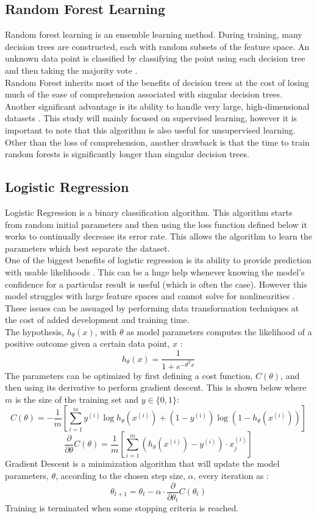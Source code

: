 \documentclass[titlepage]{article}
\begin{document}
\subsection{Random Forest Learning}
Random forest learning is an ensemble learning method. During training, many decision trees are constructed, each with random subsets of the feature space. An unknown data point is classified by classifying the point using each decision tree and then taking the majority vote \cite{RandomForestOG}.\\
Random Forest inherits most of the benefits of decision trees at the cost of losing much of the ease of comprehension associated with singular decision trees. Another significant advantage is its ability to handle very large, high-dimensional datasets \cite{RandomForestHighDim}. This study will mainly focused on supervised learning, however it is important to note that this algorithm is also useful for unsupervised learning. Other than the loss of comprehension, another drawback is that the time to train random forests is significantly longer than singular decision trees.

\subsection{Logistic Regression}
Logistic Regression is a binary classification algorithm. This algorithm starts from random initial parameters and then using the loss function defined below it works to continually decrease its error rate. This allows the algorithm to learn the parameters which best separate the dataset.\\
One of the biggest benefits of logistic regression is its ability to provide prediction with usable likelihoods \cite{LogisticRegressionOG}. This can be a huge help whenever knowing the model's confidence for a particular result is useful (which is often the case). However this model struggles with large feature spaces and cannot solve for nonlinearities \cite{LogisticRegressionDimensionaliy}. These issues can be assuaged by performing data transformation techniques at the cost of added development and training time.\\
The hypothesis, $h_\theta(x)$, with $\theta$ as model parameters computes the likelihood of a positive outcome given a certain data point, $x$ \cite{LogisticRegressionOG}:
$$h_\theta(x) = \frac{1}{1 + e^{-\theta^T x}}$$
The parameters can be optimized by first defining a cost function, $C(\theta)$, and then using its derivative to perform gradient descent. This is shown below where $m$ is the size of the training set and $y \in \{0, 1\}$\cite{LogisticRegressionMath}:
$$C(\theta) = -\frac{1}{m}\left[\sum\limits_{i=1}^m y^{(i)} \log h_\theta(x^{(i)}) + (1-y^{(i)})\log(1-h_\theta(x^{(i)}))\right]$$
$$\frac{\partial}{\partial\theta}C(\theta) = \frac{1}{m}\left[\sum\limits_{i=1}^m (h_\theta(x^{(i)}) - y^{(i)})\cdot x_j^{(i)}\right]$$
Gradient Descent is a minimization algorithm that will update the model parameters, $\theta$, according to the chosen step size, $\alpha$, every iteration as \cite{LogisticRegressionMath}:
$$\theta_{t+1} = \theta_t-\alpha\cdot\frac{\partial}{\partial\theta_t}C(\theta_t)$$
Training is terminated when some stopping criteria is reached.
\end{document}
